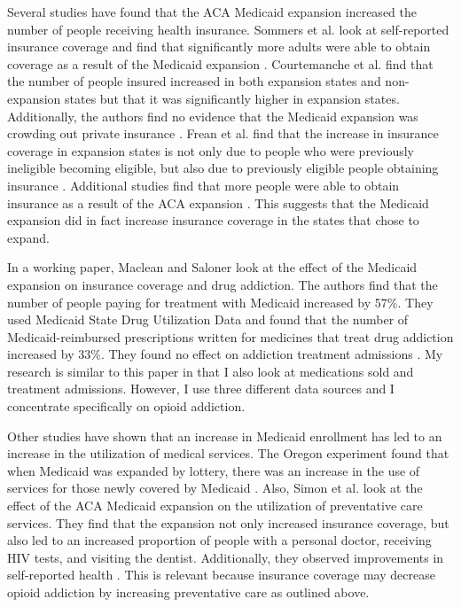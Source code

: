 \documentclass[11pt]{article}
\begin{document}
Several studies have found that the ACA Medicaid expansion increased the number of people receiving health insurance.  Sommers et al. look at self-reported insurance coverage and find that significantly more adults were able to obtain coverage as a result of the Medicaid expansion \citep{Sommers2015}.  Courtemanche et al. find that the number of people insured increased in both expansion states and non-expansion states but that it was significantly higher in expansion states.  Additionally, the authors find no evidence that the Medicaid expansion was crowding out private insurance \citep{Courtemanche2017}.  Frean et al. find that the increase in insurance coverage in expansion states is not only due to people who were previously ineligible becoming eligible, but also due to previously eligible people obtaining insurance \citep{Frean2016} .  Additional studies find that more people were able to obtain insurance as a result of the ACA expansion \citep{Sommers2014, Wherry2016}.  This suggests that the Medicaid expansion did in fact increase insurance coverage in the states that chose to expand.  

In a working paper, Maclean and Saloner look at the effect of the Medicaid expansion on insurance coverage and drug addiction.  The authors find that the number of people paying for treatment with Medicaid increased by 57\%. They used Medicaid State Drug Utilization Data and found that the number of Medicaid-reimbursed prescriptions written for medicines that treat drug addiction increased by 33\%.  They found no effect on addiction treatment admissions \citep{Maclean2017}. My research is similar to this paper in that I also look at medications sold and treatment admissions. However, I use three different data sources and I concentrate specifically on opioid addiction.   

Other studies have shown that an increase in Medicaid enrollment has led to an increase in the utilization of medical services.  The Oregon experiment found that when Medicaid was expanded by lottery, there was an increase in the use of services for those newly covered by Medicaid \citep{Baicker2013}.  Also, Simon et al. look at the effect of the ACA Medicaid expansion on the utilization of preventative care services.  They find that the expansion not only increased insurance coverage, but also led to an increased proportion of people with a personal doctor, receiving HIV tests, and visiting the dentist.  Additionally, they observed improvements in self-reported health \citep{Simon2017}.  This is relevant because insurance coverage may decrease opioid addiction by increasing preventative care as outlined above.     
\end{document}
